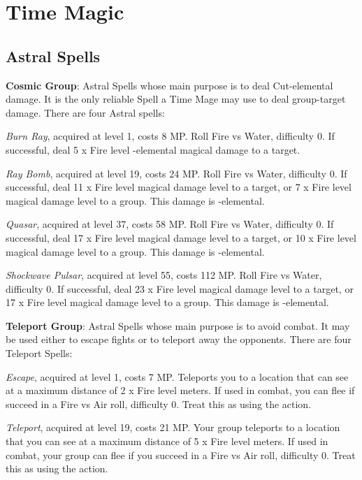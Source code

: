 \section{Time Magic}

\begin{multicols}{2}
    
    \subsection{Astral Spells}

    \textbf{Cosmic Group}: Astral Spells whose main purpose is to deal Cut-elemental damage. It is the only reliable Spell a Time Mage may use to deal group-target damage. There are four Astral spells:
    
    \textit{Burn Ray}, acquired at level 1, costs 8 MP. Roll Fire vs Water, difficulty 0. If successful, deal 5 x Fire level -elemental magical damage to a target.
    
    \textit{Ray Bomb}, acquired at level 19, costs 24 MP. Roll Fire vs Water, difficulty 0. If successful, deal 11 x Fire level magical damage level to a target, or 7 x Fire level magical damage level to a group. This damage is -elemental.
    
    \textit{Quasar}, acquired at level 37, costs 58 MP. Roll Fire vs Water, difficulty 0. If successful, deal 17 x Fire level magical damage level to a target, or 10 x Fire level magical damage level to a group. This damage is -elemental.
    
    \textit{Shockwave Pulsar}, acquired at level 55, costs 112 MP. Roll Fire vs Water, difficulty 0. If successful, deal 23 x Fire level magical damage level to a target, or 17 x Fire level magical damage level to a group. This damage is -elemental.
    
    \textbf{Teleport Group}: Astral Spells whose main purpose is to avoid combat. It may be used either to escape fights or to teleport away the opponents. There are four Teleport Spells:
	
    \textit{Escape}, acquired at level 1, costs 7 MP. Teleports you to a location that can see at a maximum distance of 2 x Fire level meters. If used in combat, you can flee if succeed in a Fire vs Air roll, difficulty 0. Treat this as using the  action.
    
    \textit{Teleport}, acquired at level 19, costs 21 MP. Your group teleports to a location that you can see at a maximum distance of 5 x Fire level meters. If used in combat, your group can flee if you succeed in a Fire vs Air roll, difficulty 0. Treat this as using the  action.
    

\end{multicols}
